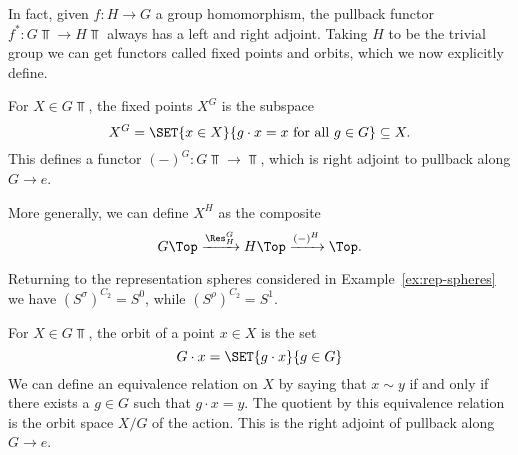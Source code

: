\documentclass{willowtreebook}
\begin{document}
\begin{remark}
    In fact, given $f \colon H \to G$ a group homomorphism, the pullback functor $f^* \colon G\Top \to H\Top$ always has a left and right adjoint. Taking $H$ to be the trivial group we can get functors called fixed points and orbits, which we now explicitly define. 
\end{remark}
\begin{definition}
    For $X \in G\Top$, the fixed points $X^G$ is the subspace
    \[
    X^G = \SET{x \in X}{g \cdot x = x \text{ for all } g \in G} \subseteq X.
    \]
This defines a functor $(-)^G \colon G\Top \to \Top$, which is right adjoint to pullback along $G \to e$. 
    
    More generally, we can define $X^H$ as the composite
    \[
    G\Top \xrightarrow{\Res^G_H} H\Top \xrightarrow{(-)^H} \Top.
    \]
\end{definition}
\begin{example}
    Returning to the representation spheres considered in Example~\eqref{ex:rep-spheres} we have $(S^{\sigma})^{C_2}  = S^0$, while $(S^{\rho})^{C_2} = S^1$. 
\end{example}
\begin{definition}
   For $X \in G\Top$, the orbit of a point $x \in X$ is the set 
   \[
   G \cdot x = \SET{g \cdot x}{g \in G}
   \]
   We can define an equivalence relation on $X$ by saying that $x \sim y$ if and only if there exists a $g \in G$ such that $g \cdot x = y$. The quotient by this equivalence relation is the orbit space $X/G$ of the action. This is the right adjoint of pullback along $G \to e$. 
\end{definition}
\end{document}
